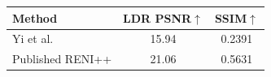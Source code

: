 \begin{tabular}{l|cc}
\hline
Method & LDR PSNR$\uparrow$ & SSIM$\uparrow$ \\
\hline
Yi et al. & 15.94 & 0.2391 \\
Published RENI++ & 21.06 & 0.5631 \\
\hline
\end{tabular}
